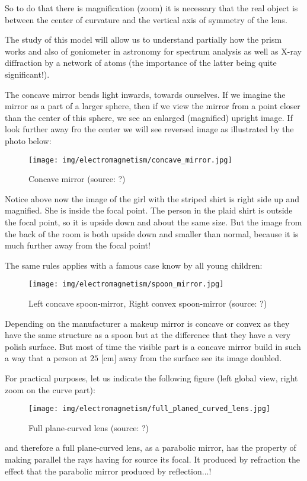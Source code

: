 	So to do that there is magnification (zoom) it is necessary that the real object is between the center of curvature and the vertical axis of symmetry of the lens.
	\begin{tcolorbox}[title=Remark,colframe=black,arc=10pt]
	The study of this model will allow us to understand partially how the prism works and also of goniometer in astronomy for spectrum analysis as well as X-ray diffraction by a network of atoms (the importance of the latter being quite significant!).
	\end{tcolorbox}
	The concave mirror bends light inwards, towards ourselves. If we imagine the mirror as a part of a larger sphere, then if we view the mirror from a point closer than the center of this sphere, we see an enlarged (magnified) upright image. If look further away fro the center we will see reversed image as illustrated by the photo below:
	\begin{figure}[H]
		\centering
		\texttt{[image: img/electromagnetism/concave\_mirror.jpg]}
		\caption{Concave mirror (source: ?)}
	\end{figure}
	Notice above now the image of the girl with the striped shirt is right side up and magnified. She is inside the focal point. The person in the plaid shirt is outside the focal point, so it is upside down and about the same size. But the image from the back of the room is both upside down and smaller than normal, because it is much further away from the focal point!
	
	The same rules applies with a famous case know by all young children:
	\begin{figure}[H]
		\centering
		\texttt{[image: img/electromagnetism/spoon\_mirror.jpg]}
		\caption{Left concave spoon-mirror, Right convex spoon-mirror (source: ?)}
	\end{figure}
	\begin{tcolorbox}[title=Remark,colframe=black,arc=10pt]
	Depending on the manufacturer a makeup mirror is concave or convex as they have the same structure as a spoon but at the difference that they have a very polish surface. But most of time the visible part is a concave mirror build in such a way that a person at $25$ [cm] away from the surface see its image doubled.
	\end{tcolorbox}
	For practical purposes, let us indicate the following figure (left global view, right zoom on the curve part):
	\begin{figure}[H]
		\centering
		\texttt{[image: img/electromagnetism/full\_planed\_curved\_lens.jpg]}
		\caption{Full plane-curved lens (source: ?)}
	\end{figure}
	and therefore a full plane-curved lens, as a parabolic mirror, has the property of making parallel the rays having for source its focal. It produced by refraction the effect that the parabolic mirror produced by reflection...!


